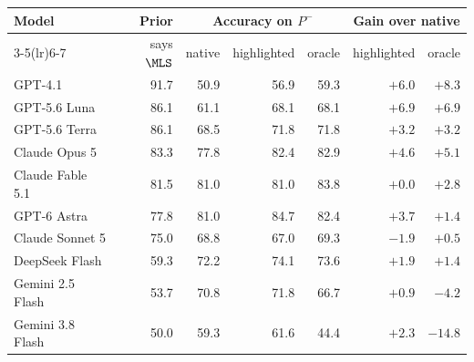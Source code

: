 \begin{tabularx}{\linewidth}{@{}Xr rrr rr@{}}
\toprule
Model & Prior & \multicolumn{3}{c}{Accuracy on $P^{-}$} & \multicolumn{2}{c}{Gain over native}\\
\cmidrule(lr){3-5}\cmidrule(lr){6-7}
 & says $\MLS$ & native & highlighted & oracle & highlighted & oracle\\
\midrule
GPT-4.1 & 91.7 & 50.9 & 56.9 & 59.3 & $\mathbf{+6.0}$ & $\mathbf{+8.3}$\\
GPT-5.6 Luna & 86.1 & 61.1 & 68.1 & 68.1 & $\mathbf{+6.9}$ & $\mathbf{+6.9}$\\
GPT-5.6 Terra & 86.1 & 68.5 & 71.8 & 71.8 & $+3.2$ & $+3.2$\\
Claude Opus 5 & 83.3 & 77.8 & 82.4 & 82.9 & $\mathbf{+4.6}$ & $\mathbf{+5.1}$\\
Claude Fable 5.1 & 81.5 & 81.0 & 81.0 & 83.8 & $+0.0$ & $+2.8$\\
GPT-6 Astra & 77.8 & 81.0 & 84.7 & 82.4 & $+3.7$ & $+1.4$\\
Claude Sonnet 5 & 75.0 & 68.8 & 67.0 & 69.3 & $-1.9$ & $+0.5$\\
DeepSeek Flash & 59.3 & 72.2 & 74.1 & 73.6 & $+1.9$ & $+1.4$\\
Gemini 2.5 Flash & 53.7 & 70.8 & 71.8 & 66.7 & $+0.9$ & $-4.2$\\
Gemini 3.8 Flash & 50.0 & 59.3 & 61.6 & 44.4 & $+2.3$ & $\mathbf{-14.8}$\\
\bottomrule
\end{tabularx}
